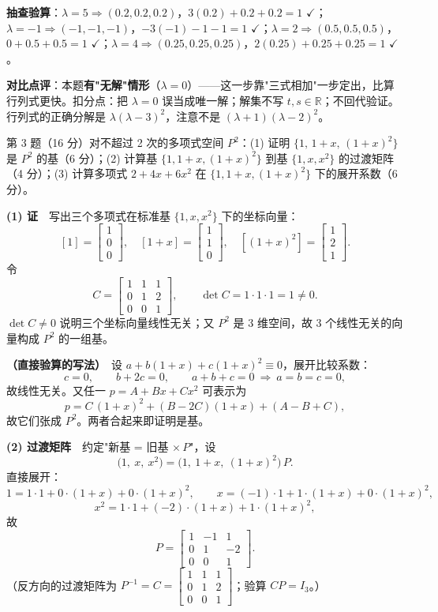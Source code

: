 \documentclass[10pt]{ctexart}
\newcommand{\Rr}{\mathbb{R}}
\newcommand{\Qhead}[2]{%
  \begin{tcolorbox}[enhanced,colback=graybg,colframe=acc,
    boxrule=0pt,leftrule=3pt,arc=2pt,top=3pt,bottom=3pt,left=8pt,right=8pt]
  {\heiti\color{acc}#1}\quad #2
  \end{tcolorbox}}
\newcommand{\Vhead}[1]{\vspace{2pt}{\heiti\color{acc2}#1}\par\vspace{-2pt}}
\begin{document}
\textbf{抽查验算}：$\lambda=5\Rightarrow(0.2,0.2,0.2)$，$3(0.2)+0.2+0.2=1$ $\checkmark$；$\lambda=-1\Rightarrow(-1,-1,-1)$，$-3(-1)-1-1=1$ $\checkmark$；$\lambda=2\Rightarrow(0.5,0.5,0.5)$，$0+0.5+0.5=1$ $\checkmark$；$\lambda=4\Rightarrow(0.25,0.25,0.25)$，$2(0.25)+0.25+0.25=1$ $\checkmark$。

\begin{cmpbox}
\textbf{对比点评}：本题\textbf{有"无解"情形}（$\lambda=0$）——这一步靠"三式相加"一步定出，比算行列式更快。扣分点：把 $\lambda=0$ 误当成唯一解；解集不写 $t,s\in\Rr$；不回代验证。行列式的正确分解是 $\lambda(\lambda-3)^2$，注意不是 $(\lambda+1)(\lambda-2)^2$。
\end{cmpbox}

\Qhead{第 3 题（16 分）}{对不超过 2 次的多项式空间 $P^2$：(1) 证明 $\{1,\,1+x,\,(1+x)^2\}$ 是 $P^2$ 的基（6 分）；(2) 计算基 $\{1,1+x,(1+x)^2\}$ 到基 $\{1,x,x^2\}$ 的过渡矩阵（4 分）；(3) 计算多项式 $2+4x+6x^2$ 在 $\{1,1+x,(1+x)^2\}$ 下的展开系数（6 分）。}

\Vhead{版本 A：标准版}
\textbf{(1) 证}　写出三个多项式在标准基 $\{1,x,x^2\}$ 下的坐标向量：
\[
[1]=\begin{bmatrix}1\\0\\0\end{bmatrix},\quad
[1+x]=\begin{bmatrix}1\\1\\0\end{bmatrix},\quad
[(1+x)^2]=\begin{bmatrix}1\\2\\1\end{bmatrix}.
\]
令
\[
C=\begin{bmatrix}1&1&1\\0&1&2\\0&0&1\end{bmatrix},
\qquad \det C=1\cdot1\cdot1=1\neq0 .
\]
$\det C\neq0$ 说明三个坐标向量线性无关；又 $P^2$ 是 $3$ 维空间，故 $3$ 个线性无关的向量构成 $P^2$ 的一组基。

\textbf{（直接验算的写法）}　设 $a+b(1+x)+c(1+x)^2\equiv0$，展开比较系数：
\[
c=0,\qquad b+2c=0,\qquad a+b+c=0\ \Longrightarrow\ a=b=c=0,
\]
故线性无关。又任一 $p=A+Bx+Cx^2$ 可表示为
\[
p=C\,(1+x)^2+(B-2C)(1+x)+(A-B+C),
\]
故它们张成 $P^2$。两者合起来即证明是基。

\textbf{(2) 过渡矩阵}　约定"新基 = 旧基 $\times\,P$"，设
\[
\big(1,\ x,\ x^2\big)=\big(1,\ 1+x,\ (1+x)^2\big)\,P .
\]
直接展开：
\[
1=1\cdot1+0\cdot(1+x)+0\cdot(1+x)^2,\qquad
x=(-1)\cdot1+1\cdot(1+x)+0\cdot(1+x)^2,
\]
\[
x^2=1\cdot1+(-2)\cdot(1+x)+1\cdot(1+x)^2 ,
\]
故
\[
\boxed{P=\begin{bmatrix}1&-1&1\\0&1&-2\\0&0&1\end{bmatrix}} .
\]
（反方向的过渡矩阵为 $P^{-1}=C=\begin{bmatrix}1&1&1\\0&1&2\\0&0&1\end{bmatrix}$；验算 $CP=I_3$。）
\end{document}

